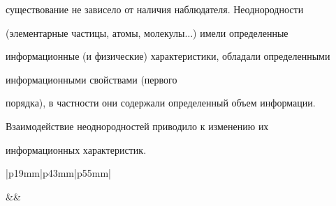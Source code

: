 существование не зависело от наличия наблюдателя. Неоднородности 


(элементарные частицы, атомы, молекулы$\ldots$) имели определенные 


информационные (и физические) характеристики, обладали определенными 


информационными свойствами (первого 


порядка), в частности они содержали определенный объем информации. 


Взаимодействие неоднородностей приводило к изменению их 


информационных характеристик.





\addtocounter{table}{-1}


     \begin{table}\small


     \begin{center}




     \vspace*{2ex}


     


\begin{tabular}{|p{19mm}|p{43mm}|p{55mm}|}


     \hline


&&


\\


\hline


\\



\end{tabular}
\end{center}
\end{table}
